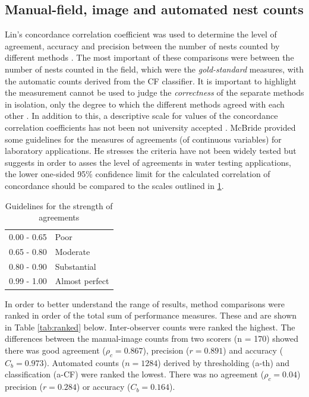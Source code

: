 \subsection{Manual-field, image and automated nest counts}
Lin's concordance correlation coefficient was used to determine the level of agreement, accuracy and precision between the number of nests counted by different methods \cite{Lin1989}. The most important of these comparisons were between the number of nests counted in the field, which were the \emph{gold-standard} measures, with the automatic counts derived from the CF classifier. It is important to highlight the measurement cannot be used to judge the \emph{correctness} of the separate methods in isolation, only the degree to which the different methods agreed with each other \cite{Kwiecien2011}. In addition to this, a descriptive scale for values of the concordance correlation coefficients has not been not university accepted \cite{Mcbride2005}. McBride  provided some guidelines for the measures of agreements (of continuous variables) for laboratory applications. He stresses the criteria have not been widely tested but suggests in order to asses the level of agreements in water testing applications, the lower one-sided 95\% confidence limit for the calculated correlation of concordance should be compared to the scales outlined in \ref{tab:ccc-guidelines}.

\begin{table}[!htbp]\myfloatalign
\caption[Concordance of correlation guideline]{Guidelines for the strength of agreements}\label{tab:ccc-guidelines}
\begin{tabular}{ll} \toprule
0.00 - 0.65 & Poor\\
0.65 - 0.80 & Moderate\\
0.80 - 0.90 & Substantial\\
0.99 - 1.00 & Almost perfect\\ \bottomrule
\end{tabular}
\end{table}

In order to better understand the range of results, method comparisons were ranked in order of the total sum of performance measures. These and are shown in Table \ref{tab:ranked} below. Inter-observer counts were ranked the highest. The differences between the manual-image counts from two scorers (n = 170) showed there was good agreement ($\rho_{c} = 0.867$), precision ($r = 0.891$) and accuracy ($C_{b} = 0.973$). Automated counts ($n = 1284$) derived by thresholding (a-th) and classification (a-CF) were ranked the lowest. There was no agreement ($\rho_{c} = 0.04 $) precision ($r = 0.284$) or accuracy ($C_{b} = 0.164$).

